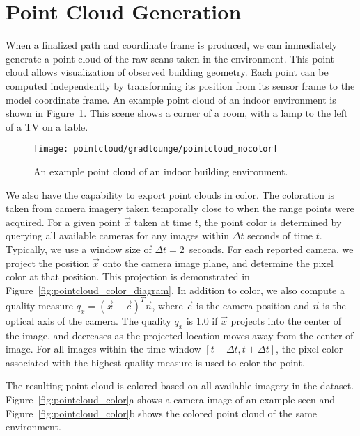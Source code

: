 \documentclass[12pt,onecolumn,oneside]{book}
\begin{document}
\section{Point Cloud Generation}
\label{sec:pointcloud}

When a finalized path and coordinate frame is produced, we can immediately generate a point cloud of the raw scans taken in the environment.  This point cloud allows visualization of observed building geometry.  Each point can be computed independently by transforming its position from its sensor frame to the model coordinate frame.  An example point cloud of an indoor environment is shown in Figure~\ref{fig:pointcloud_nocolor}.  This scene shows a corner of a room, with a lamp to the left of a TV on a table.

\begin{figure}
	\centerline{\texttt{[image: pointcloud/gradlounge/pointcloud\_nocolor]}}
	\caption{An example point cloud of an indoor building environment.}
	\label{fig:pointcloud_nocolor}
\end{figure}

We also have the capability to export point clouds in color.  The coloration is taken from camera imagery taken temporally close to when the range points were acquired.  For a given point $\vec{x}$ taken at time $t$, the point color is determined by querying all available cameras for any images within $\Delta t$ seconds of time $t$.  Typically, we use a window size of $\Delta t = 2$~seconds.  For each reported camera, we project the position $\vec{x}$ onto the camera image plane, and determine the pixel color at that position.  This projection is demonstrated in Figure~\ref{fig:pointcloud_color_diagram}.  In addition to color, we also compute a quality measure $q_x = (\vec{x} - \vec{c})^T \vec{n}$, where $\vec{c}$ is the camera position and $\vec{n}$ is the optical axis of the camera.  The quality $q_x$ is $1.0$ if $\vec{x}$ projects into the center of the image, and decreases as the projected location moves away from the center of image.  For all images within the time window $[t - \Delta t, t + \Delta t]$, the pixel color associated with the highest quality measure is used to color the point.

The resulting point cloud is colored based on all available imagery in the dataset.  Figure~\ref{fig:pointcloud_color}a shows a camera image of an example seen and Figure~\ref{fig:pointcloud_color}b shows the colored point cloud of the same environment.
\end{document}

